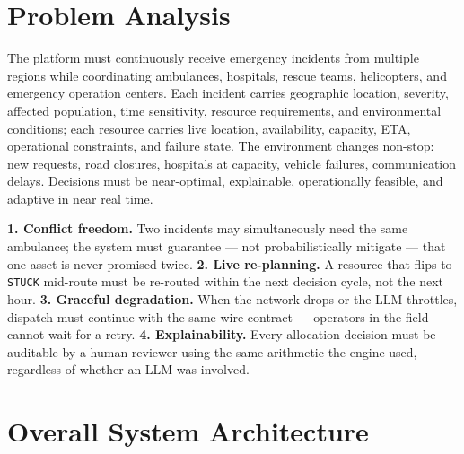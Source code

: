 \documentclass[10pt,letterpaper]{article}
\begin{document}
\section{Problem Analysis}
The platform must continuously receive emergency incidents from multiple regions while coordinating ambulances, hospitals, rescue teams, helicopters, and emergency operation centers. Each incident carries geographic location, severity, affected population, time sensitivity, resource requirements, and environmental conditions; each resource carries live location, availability, capacity, ETA, operational constraints, and failure state. The environment changes non-stop: new requests, road closures, hospitals at capacity, vehicle failures, communication delays. Decisions must be near-optimal, explainable, operationally feasible, and adaptive in near real time.

\begin{tcolorbox}[colback=csbg, colframe=csgreen, boxrule=0.5pt, arc=3pt,
    left=8pt, right=8pt, top=4pt, bottom=4pt, title=\textbf{Why this is hard},
    fonttitle=\bfseries\small]
\footnotesize
\textbf{1. Conflict freedom.} Two incidents may simultaneously need the same ambulance; the system must guarantee --- not probabilistically mitigate --- that one asset is never promised twice. \textbf{2. Live re-planning.} A resource that flips to \texttt{STUCK} mid-route must be re-routed within the next decision cycle, not the next hour. \textbf{3. Graceful degradation.} When the network drops or the LLM throttles, dispatch must continue with the same wire contract --- operators in the field cannot wait for a retry. \textbf{4. Explainability.} Every allocation decision must be auditable by a human reviewer using the same arithmetic the engine used, regardless of whether an LLM was involved.
\end{tcolorbox}

\section{Overall System Architecture}
\end{document}
